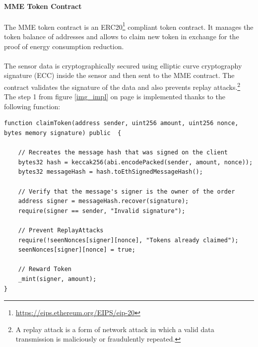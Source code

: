 \documentclass[11pt]{article}
\begin{document}
\paragraph{MME Token Contract}
The MME token contract is an ERC20\footnote{\href{https://eips.ethereum.org/EIPS/eip-20}{https://eips.ethereum.org/EIPS/eip-20}} compliant token contract. It manages the token balance of addresses and allows to claim new token in exchange for the proof of energy consumption reduction. \\\\
The sensor data is cryptographically secured using elliptic curve cryptography signature (ECC) \cite{24} inside the sensor and then sent to the MME contract. The contract validates the signature of the data and also prevents replay attacks.\footnote{A replay attack is a form of network attack in which a valid data transmission is maliciously or fraudulently repeated.}\\
The step 1 from figure \ref{img_impl} on page \pageref{img_impl} is implemented thanks to the following function:
\begin{lstlisting}[language=Solidity, firstnumber=28,caption={src/smartcontracts/contracts/MMEToken.sol},captionpos=b]
function claimToken(address sender, uint256 amount, uint256 nonce, bytes memory signature) public  {

	// Recreates the message hash that was signed on the client
	bytes32 hash = keccak256(abi.encodePacked(sender, amount, nonce));
	bytes32 messageHash = hash.toEthSignedMessageHash();

	// Verify that the message's signer is the owner of the order
	address signer = messageHash.recover(signature);
	require(signer == sender, "Invalid signature");

	// Prevent ReplayAttacks
	require(!seenNonces[signer][nonce], "Tokens already claimed");
	seenNonces[signer][nonce] = true;

	// Reward Token
	_mint(signer, amount);
}
\end{lstlisting}
\end{document}
